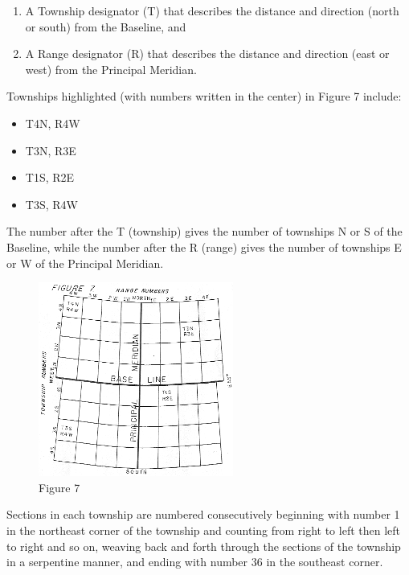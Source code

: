 \documentclass[
  letterpaper,
  twocolumn,
  portrait]{scrbook}
\providecommand{\tightlist}{%
  \setlength{\itemsep}{0pt}\setlength{\parskip}{0pt}}\usepackage{longtable,booktabs,array}
\begin{document}
\begin{enumerate}
\def\labelenumi{\arabic{enumi}.}
\tightlist
\item
  A Township designator (T) that describes the distance and direction
  (north or south) from the Baseline, and
\item
  A Range designator (R) that describes the distance and direction (east
  or west) from the Principal Meridian.
\end{enumerate}

Townships highlighted (with numbers written in the center) in Figure 7
include:

\begin{itemize}
\tightlist
\item
  T4N, R4W
\item
  T3N, R3E
\item
  T1S, R2E
\item
  T3S, R4W
\end{itemize}

The number after the T (township) gives the number of townships N or S
of the Baseline, while the number after the R (range) gives the number
of townships E or W of the Principal Meridian.

\begin{figure}

{\centering \includegraphics{fig-7-townships.png}

}

\caption{\label{fig-township}Figure 7}

\end{figure}

Sections in each township are numbered consecutively beginning with
number 1 in the northeast corner of the township and counting from right
to left then left to right and so on, weaving back and forth through the
sections of the township in a serpentine manner, and ending with number
36 in the southeast corner.
\end{document}
